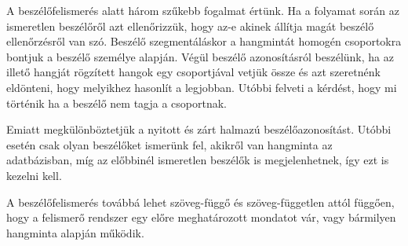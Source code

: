 A beszélőfelismerés alatt három szűkebb fogalmat értünk. Ha a folyamat során az ismeretlen beszélőről azt ellenőrizzük, hogy az-e akinek állítja magát beszélő ellenőrzésről van szó. Beszélő szegmentáláskor a hangmintát homogén csoportokra bontjuk a beszélő személye alapján. Végül beszélő azonosításról beszélünk, ha az illető hangját rögzített hangok egy csoportjával vetjük össze és azt szeretnénk eldönteni, hogy melyikhez hasonlít a legjobban. Utóbbi felveti a kérdést, hogy mi történik ha a beszélő nem tagja a csoportnak. 

Emiatt megkülönböztetjük a nyitott és zárt halmazú beszélőazonosítást. Utóbbi esetén csak olyan beszélőket ismerünk fel, akikről van hangminta az adatbázisban, míg az előbbinél ismeretlen beszélők is megjelenhetnek, így ezt is kezelni kell.

A beszélőfelismerés továbbá lehet szöveg-függő és szöveg-független attól függően, hogy a felismerő rendszer egy előre meghatározott mondatot vár, vagy bármilyen hangminta alapján működik.

